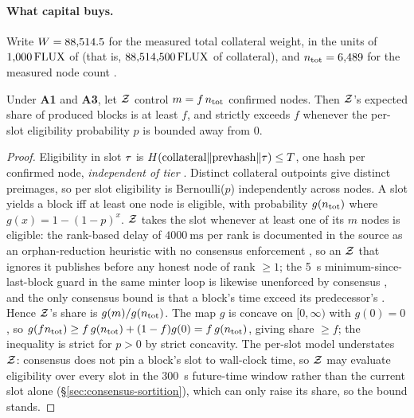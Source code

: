 \paragraph{What capital buys.} Write $W = 88{,}514.5$ for the measured total
collateral weight, in the units of $1{,}000\,\mathrm{FLUX}$ of  (that is,
$88{,}514{,}500\,\mathrm{FLUX}$ of collateral), and $n_{\mathrm{tot}} = 6{,}489$ for the measured node count
.

\begin{property}
\label{prop:share}
\shipped Under \textbf{A1} and \textbf{A3}, let $\mathcal{Z}$ control $m = f\,n_{\mathrm{tot}}$
confirmed nodes. Then $\mathcal{Z}$'s expected share of produced blocks is at least $f$, and strictly
exceeds $f$ whenever the per-slot eligibility probability $p$ is bounded away from $0$.
\end{property}

\begin{proof}
Eligibility in slot $\tau$ is $H(\text{collateral}\Vert\text{prevhash}\Vert\tau) \le T$, one hash
per confirmed node, \emph{independent of tier}
. Distinct collateral outpoints give distinct
preimages, so per slot eligibility is Bernoulli($p$) independently across nodes. A slot yields a
block iff at least one node is eligible, with probability $g(n_{\mathrm{tot}})$ where
$g(x) = 1-(1-p)^x$. $\mathcal{Z}$ takes the slot whenever at least one of its $m$ nodes is eligible: the
rank-based delay of $\qty{4000}{\milli\second}$ per rank is documented in the source as an
orphan-reduction heuristic with no consensus enforcement
, so an $\mathcal{Z}$ that ignores it publishes
before any honest node of rank $\ge 1$; the \qty{5}{\second} minimum-since-last-block guard in the
same minter loop is likewise unenforced by consensus ,
and the only consensus bound is that a block's time exceed its predecessor's
. Hence
$\mathcal{Z}$'s share is $g(m)/g(n_{\mathrm{tot}})$. The map $g$ is concave on $[0,\infty)$ with
$g(0)=0$, so $g(fn_{\mathrm{tot}}) \ge f\,g(n_{\mathrm{tot}}) + (1-f)g(0) =
f\,g(n_{\mathrm{tot}})$, giving share $\ge f$; the inequality is strict for $p>0$ by strict
concavity. The per-slot model understates $\mathcal{Z}$: consensus does not pin a block's slot to
wall-clock time, so $\mathcal{Z}$ may evaluate eligibility over every slot in the \qty{300}{\second}
future-time window rather than the current slot alone (\S\ref{sec:consensus-sortition}), which can
only raise its share, so the bound stands.
\end{proof}


